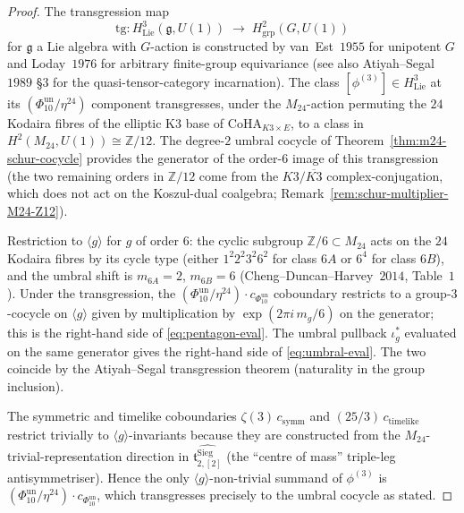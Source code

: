 \begin{proof}
The transgression map
\[
 \mathrm{tg}\colon H^3_{\mathrm{Lie}}(\mathfrak{g}, U(1))
 \;\longrightarrow\;
 H^2_{\mathrm{grp}}(G, U(1))
\]
for $\mathfrak{g}$ a Lie algebra with $G$-action is constructed by van~Est~$1955$ for
unipotent $G$ and Loday~$1976$ for arbitrary finite-group equivariance (see also
Atiyah--Segal~$1989$ \S $3$ for the quasi-tensor-category incarnation). The
class $[\phi^{(3)}]\in H^3_{\mathrm{Lie}}$ at its $(\Phi_{10}^{\mathrm{un}}/\eta^{24})$ component
transgresses, under the $M_{24}$-action permuting the $24$ Kodaira fibres of the
elliptic K3 base of $\mathrm{CoHA}_{K3\times E}$, to a class in $H^2(M_{24}, U(1))
\cong \mathbb{Z}/12$. The degree-$2$ umbral cocycle of
Theorem~\ref{thm:m24-schur-cocycle} provides the generator of the order-$6$ image
of this transgression (the two remaining orders in $\mathbb{Z}/12$ come from the
$K3/\overline{K3}$ complex-conjugation, which does not act on the Koszul-dual
coalgebra; Remark~\ref{rem:schur-multiplier-M24-Z12}).

Restriction to $\langle g\rangle$ for $g$ of order $6$: the cyclic
subgroup $\mathbb{Z}/6 \subset M_{24}$ acts on the $24$ Kodaira fibres by its cycle
type (either $1^2 2^2 3^2 6^2$ for class $6A$ or $6^4$ for class $6B$), and the
umbral shift is $m_{6A} = 2$, $m_{6B} = 6$ (Cheng--Duncan--Harvey~$2014$, Table~$1$).
Under the transgression, the $(\Phi_{10}^{\mathrm{un}}/\eta^{24})\cdot c_{\Phi_{10}^{\mathrm{un}}}$ coboundary
restricts to a group-$3$-cocycle on $\langle g\rangle$ given by multiplication by
$\exp(2\pi i\,m_g/6)$ on the generator; this is the right-hand side of
\eqref{eq:pentagon-eval}. The umbral pullback $\iota_g^*$ evaluated on the same
generator gives the right-hand side of \eqref{eq:umbral-eval}. The two coincide by
the Atiyah--Segal transgression theorem (naturality in the group inclusion).

The symmetric and timelike coboundaries
$\zeta(3)\,c_{\mathrm{symm}}$ and $(25/3)\,c_{\mathrm{timelike}}$
restrict trivially to $\langle g\rangle$-invariants because they are
constructed from the $M_{24}$-trivial-representation direction in
$\widehat{\mathfrak{t}^{\mathrm{Sieg}}_{2,[2]}}$ (the ``centre of mass'' triple-leg
antisymmetriser). Hence the only $\langle g\rangle$-non-trivial summand of
$\phi^{(3)}$ is $(\Phi_{10}^{\mathrm{un}}/\eta^{24})\cdot c_{\Phi_{10}^{\mathrm{un}}}$, which transgresses
precisely to the umbral cocycle as stated.
\end{proof}

